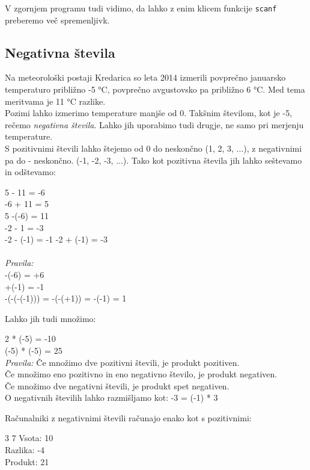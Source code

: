 V zgornjem programu tudi vidimo, da lahko z enim klicem funkcije \verb+scanf+ preberemo več spremenljivk.

\subsection*{Negativna števila}
Na meteorološki postaji Kredarica so leta 2014 izmerili povprečno januarsko temperaturo približno -5 °C, povprečno avgustovsko pa približno 6 °C.
Med tema meritvama je 11 °C razlike. \\
Pozimi lahko izmerimo temperature manjše od 0. Takšnim številom, kot je -5, rečemo \emph{negativna števila}. Lahko jih uporabimo tudi drugje, ne samo pri merjenju temperature. \\
S pozitivnimi števili lahko štejemo od 0 do neskončno (1, 2, 3, ...), z negativnimi pa do - neskončno. (-1, -2, -3, ...). Tako kot pozitivna števila jih lahko seštevamo in odštevamo:

\begin{examples}
5 - 11 = -6 \\
-6 + 11 = 5 \\
5 -(-6) = 11 \\
-2 - 1 = -3 \\ 
-2 - (-1) = -1
-2 + (-1) = -3 \\\\
\emph{Pravila:}\\
-(-6) = +6\\
+(-1) = -1 \\
-(-(-(-1))) = -(-(+1)) = -(-1) = 1
\end{examples}

Lahko jih tudi množimo:

\begin{examples}
2 * (-5) = -10 \\
(-5) * (-5) = 25 \\

\emph{Pravila:}
Če množimo dve pozitivni števili, je produkt pozitiven. \\
Če množimo eno pozitivno in eno negativno število, je produkt negativen. \\
Če množimo dve negativni števili, je produkt spet negativen. \\
O negativnih številih lahko razmišljamo kot: -3 = (-1) * 3
\end{examples}

Računalniki z negativnimi števili računajo enako kot s pozitivnimi:

\begin{examples}


\begin{inout}
3 7
\tcblower
Vsota: 10 \\
Razlika: -4 \\
Produkt: 21
\end{inout}

\end{examples}

